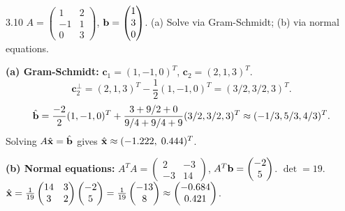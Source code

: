 \begin{exercise}{3.10}
$A=\begin{pmatrix}1&2\\-1&1\\0&3\end{pmatrix}$, $\mathbf{b}=\begin{pmatrix}1\\3\\0\end{pmatrix}$. (a) Solve via Gram-Schmidt; (b) via normal equations.
\end{exercise}
\begin{solution}
\textbf{(a) Gram-Schmidt:} $\mathbf{c}_1=(1,-1,0)^T$, $\mathbf{c}_2=(2,1,3)^T$.
\[
\mathbf{c}_2^\perp = (2,1,3)^T - \frac{1}{2}(1,-1,0)^T = (3/2,3/2,3)^T.
\]
\[
\hat{\mathbf{b}} = \frac{-2}{2}(1,-1,0)^T + \frac{3+9/2+0}{9/4+9/4+9}(3/2,3/2,3)^T \approx (-1/3,5/3,4/3)^T.
\]
Solving $A\hat{\mathbf{x}}=\hat{\mathbf{b}}$ gives $\hat{\mathbf{x}}\approx(-1.222,\;0.444)^T$.

\textbf{(b) Normal equations:} $A^TA=\begin{pmatrix}2&-3\\-3&14\end{pmatrix}$, $A^T\mathbf{b}=\begin{pmatrix}-2\\5\end{pmatrix}$. $\det=19$.
$\hat{\mathbf{x}}=\frac{1}{19}\begin{pmatrix}14&3\\3&2\end{pmatrix}\begin{pmatrix}-2\\5\end{pmatrix}=\frac{1}{19}\begin{pmatrix}-13\\8\end{pmatrix}\approx\begin{pmatrix}-0.684\\0.421\end{pmatrix}$.


\end{solution}
